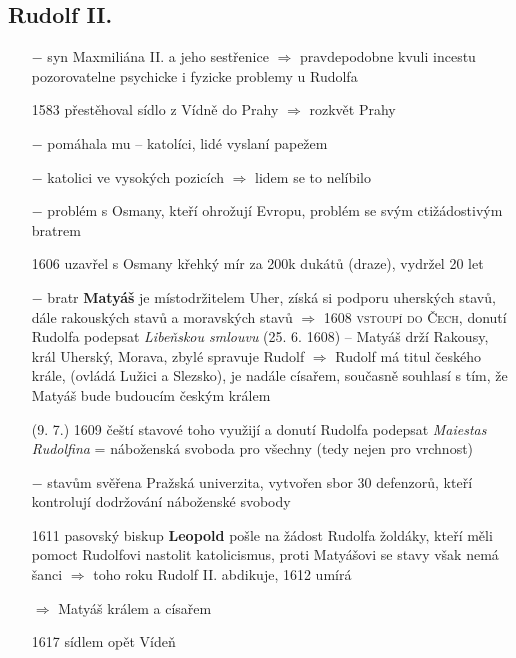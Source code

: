 \documentclass{article}
\begin{document}
\subsection*{Rudolf II.}
\begin{itemize}
    \vspace{-0.5em}
    \setlength\itemsep{0.15em}
    \item[$-$] syn Maxmiliána II. a jeho sestřenice $\Rightarrow$ pravdepodobne kvuli incestu pozorovatelne psychicke i fyzicke problemy u Rudolfa
    \item[1583] přestěhoval sídlo z Vídně do Prahy $\Rightarrow$ rozkvět Prahy
    \item[$-$] pomáhala mu  -- katolíci, lidé vyslaní papežem
    \item[$-$] katolici ve vysokých pozicích $\Rightarrow$ lidem se to nelíbilo


    \item[$-$] problém s Osmany, kteří ohrožují Evropu, problém se svým ctižádostivým bratrem
    \item[1606] uzavřel s Osmany křehký mír za 200k dukátů (draze), vydržel 20 let
    \item[$-$] bratr \textbf{Matyáš} je místodržitelem Uher, získá si podporu uherských stavů, dále rakouských stavů a moravských stavů $\Rightarrow$ 1608 \textsc{vstoupí do Čech}, donutí Rudolfa podepsat \textit{Libeňskou smlouvu} (25. 6. 1608) -- Matyáš drží Rakousy, král Uherský, Morava, zbylé spravuje Rudolf $\Rightarrow$ Rudolf má titul českého krále, (ovládá Lužici a Slezsko), je nadále císařem, současně souhlasí s tím, že Matyáš bude budoucím českým králem

    \item[(9. 7.) 1609] čeští stavové toho využijí a donutí Rudolfa podepsat \textit{Maiestas Rudolfina} = náboženská svoboda pro všechny (tedy nejen pro vrchnost)
    \item[$-$] stavům svěřena Pražská univerzita, vytvořen sbor 30 defenzorů, kteří kontrolují dodržování náboženské svobody

    \item[1611] pasovský biskup \textbf{Leopold} pošle na žádost Rudolfa žoldáky, kteří měli pomoct Rudolfovi nastolit katolicismus, proti Matyášovi se stavy však nemá šanci $\Rightarrow$ toho roku Rudolf II. abdikuje, 1612 umírá
    \item[$\Rightarrow$]  Matyáš králem a císařem
    \item[1617]  sídlem opět Vídeň


\end{itemize}
\end{document}
